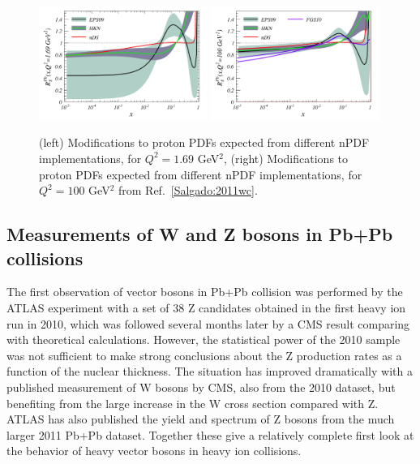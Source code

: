 \begin{figure}[!htb]
\begin{center}
\includegraphics[width=0.49\textwidth]{electroweak_figs/gluonsnew.pdf}
\includegraphics[width=0.49\textwidth]{electroweak_figs/gluonsnew100.pdf}
\caption[]{
(left) Modifications to proton PDFs expected from different nPDF implementations, for $Q^2=1.69$ GeV$^2$,
(right) Modifications to proton PDFs expected from different nPDF implementations, for $Q^2=100$ GeV$^2$
from Ref.~\ref{Salgado:2011wc}.
}
\label{fig:pas:salgado}
\end{center}
\end{figure}

\subsection{Measurements of W and Z bosons in Pb+Pb collisions}

The first observation of vector bosons in Pb+Pb collision was performed by the ATLAS
experiment with a set of 38 Z candidates obtained in the first heavy ion run in 2010, which
was followed several months later by a CMS result comparing with theoretical calculations.
However, the statistical power of the 2010 sample was not sufficient to make strong conclusions
about the Z production rates as a function of the nuclear thickness.
The situation has improved dramatically with a published measurement of W bosons by CMS, also from the
2010 dataset, but benefiting from the large increase in the W cross section compared with Z.
ATLAS has also published the yield and spectrum of Z bosons from the much larger 2011 Pb+Pb dataset.
Together these give a relatively complete first look at the behavior of heavy vector bosons in 
heavy ion collisions.


